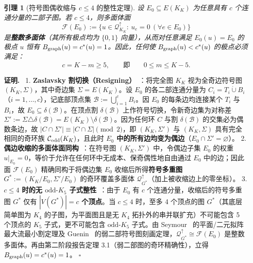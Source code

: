 \documentclass[11pt,a4paper]{ctexart}
\newtheorem{lemma}[theorem]{引理}
\theoremstyle{definition}
\newenvironment{proofcn}{\par\noindent\textbf{证明.}\ }{\hfill$\square$\par}
\newcommand{\Odd}{\mathcal C_{\rm odd}}
\newcommand{\1}{\boldsymbol 1}
\newcommand{\0}{\boldsymbol 0}
\newcommand{\bgraph}{B_{\rm graph}}
\newcommand{\ct}{c^*}
\begin{document}
\begin{lemma}[符号图偶收缩与 $c\le 4$ 的整性定理]\label{lem:c_ge_5}
设 $E_0\subseteq E(K_K)$ 为任意具有 $c$ 个连通分量的二部子图。若 $c\le 4$，则多面体面
\[
 \mathcal F(E_0):=\bigl\{u\in\mathcal Q_{K_K}^{\uparrow}:\ u_e=0\ (\forall e\in E_0)\bigr\}
\]
是\textbf{整数多面体}（其所有极点均为 $\{0,1\}$ 向量），从而对任意满足 $E_0(u)=E_0$ 的极点 $u$ 恒有 $\bgraph(u)=\ct(u)=1$。因此，任何使 $\bgraph(u)<\ct(u)$ 的极点必须满足：
\begin{equation}\label{eq:c_ge_5_bound}
 \boxed{c = K - m \ge 5,\qquad\text{即}\qquad 0 \le m \le K - 5.}
\end{equation}
\end{lemma}
\begin{proofcn}
1. \textbf{Zaslavsky 割切换（Resigning）}~\cite{Zaslavsky1982}：将完全图 $K_K$ 视为全奇边符号图 $(K_K,\Sigma)$，其中奇边集 $\Sigma=E(K_K)$。设 $E_0$ 的各二部连通分量为 $C_i=T_i\dot\cup B_i$（$i=1,\dots,c$），记底部顶点集 $\mathcal B:=\bigcup_{i=1}^c B_i$。因 $E_0$ 的每条边均连接某个 $T_i$ 与 $B_i$，故 $E_0\subseteq\delta(\mathcal B)$。在顶点割 $\delta(\mathcal B)$ 上作符号切换，令新奇边集为对称差 $\Sigma':=\Sigma\triangle\delta(\mathcal B)=E(K_K)\setminus\delta(\mathcal B)$。因为任何环 $C$ 与割 $\delta(\mathcal B)$ 的交集必为偶数条边，故 $|C\cap\Sigma'|\equiv|C\cap\Sigma|\pmod 2$，即 $(K_K,\Sigma')$ 与 $(K_K,\Sigma)$ 具有完全相同的奇环族 $\Odd(K_K)$，且此时 \textbf{$E_0$ 中的所有边均变为偶边}（$E_0\cap\Sigma'=\varnothing$）。
2. \textbf{偶边收缩的多面体面同构}~\cite{Gerards1995,Schrijver2003}：在符号图 $(K_K,\Sigma')$ 中，令偶边子集 $E_0$ 的权重 $u|_{E_0}=0$，等价于允许在任何环中无成本、保奇偶性地自由通过 $E_0$ 中的边；因此面 $\mathcal F(E_0)$ 精确同构于将偶边集 $E_0$ 收缩后所得\textbf{符号多重图} $G^*:=(K_K/E_0,\Sigma'/E_0)$ 的奇环覆盖多面体 $\mathcal Q_{G^*}^{\uparrow}$（加上被收缩边上的零坐标）。
3. \textbf{$c\le 4$ 时的无 $\text{odd-}K_5$ 子式整性}~\cite{Seymour1977,Barahona1983,Guenin2001,Schrijver2002}：由于 $E_0$ 有 $c$ 个连通分量，收缩后的符号多重图 $G^*$ 仅有 \textbf{$|V(G^*)|=c$ 个顶点}。当 $c\le 4$ 时，至多 4 个顶点的图 $G^*$（其底层简单图为 $K_4$ 的子图，为平面图且是无 $K_4$ 拓扑外的串并联扩充）不可能包含 5 个顶点的 $K_5$ 子式，更不可能包含 $\text{odd-}K_5$ 子式。由 Seymour~\cite{Seymour1977} 的平面/二元拟阵最大流最小割定理及 Guenin~\cite{Guenin2001} 的弱二部符号图刻画定理，$\mathcal Q_{G^*}^{\uparrow}\cong\mathcal F(E_0)$ 是整数多面体。再由第二阶段报告定理 3.1（弱二部图的奇环精确性），立得 $\bgraph(u)=\ct(u)=1$。
\end{proofcn}
\end{document}
